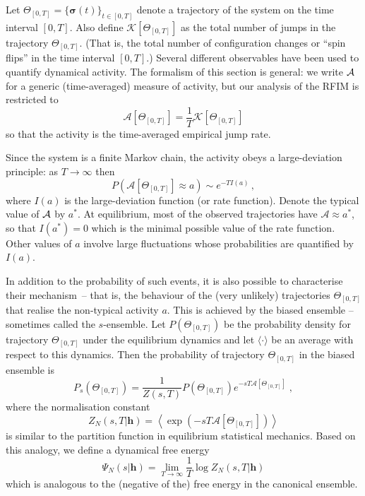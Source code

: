 \documentclass{iopart}
\begin{document}
Let $\Theta_{[0,T]} = \{ \bm{\sigma}(t) \}_{t \in [0,T]}$ denote a trajectory of the system on the time interval $[0,T]$.
Also define $\mathcal{K}[\Theta_{[0,T]}]$ as the total number of jumps in the trajectory $\Theta_{[0,T]}$.  (That is, the total number of configuration changes or ``spin flips'' in the time interval $[0,T]$.)
Several different observables have been used to quantify dynamical activity. 
The formalism of this section is general: we write ${\cal A}$ for a generic (time-averaged) measure of activity, but our analysis of the RFIM is restricted to
\begin{equation}
  \label{eq:7}
  \mathcal{A}[\Theta_{[0,T]}] = \frac{1}{T}\mathcal{K}[\Theta_{[0,T]}]
\end{equation}
so that the activity is the time-averaged empirical jump rate.

Since the system is a finite Markov chain, the activity obeys a large-deviation principle: as $T\to\infty$ then
\begin{equation}
  \label{eq:LDP_time-integrated_activity}
  P\left(\mathcal{A}[\Theta_{[0,T]}] \approx a\right) {\sim} e^{-T I(a)} \, ,
\end{equation}
where $I(a)$ is the large-deviation function (or rate function).  Denote the typical value of ${\cal A}$ by $a^\ast$.  
At equilibrium, most of the observed trajectories have $\mathcal{A}\approx a^{\ast}$, 
so that
$I(a^{\ast}) = 0$ which is the minimal possible value of the rate function. Other values of $a$ involve large fluctuations whose probabilities are quantified by $I(a)$. 

In addition to the probability of such events, it is also possible to characterise their mechanism~-- that is, the behaviour of the (very unlikely) trajectories $\Theta_{[0,T]}$ that realise the non-typical activity $a$.  
This is achieved by the biased ensemble 
 -- sometimes called the $s$-ensemble.  Let $P( \Theta_{[0,T]} )$ be the probability density for trajectory $\Theta_{[0,T]} $ under the equilibrium dynamics and let $\langle \cdot \rangle$ be an average with respect to this dynamics.  Then the  probability of trajectory $\Theta_{[0,T]} $ in the biased ensemble is 
\begin{equation}
  \label{eq:biased_ensemble}
  P_{s}( \Theta_{[0,T]} ) = \frac{1}{Z(s,T)} P( \Theta_{[0,T]} ) e^{-s T \mathcal{A}[ \Theta_{[0,T]} ]} \; ,
\end{equation}
where the normalisation constant
\begin{equation}\label{eq:partition_function_biased_ens}
  Z_N(s,T|\bm{h}) = \left\langle \exp(-s T \mathcal{A}[\Theta_{[0,T]}]) \right\rangle  
\end{equation}
is similar to the partition function in equilibrium statistical mechanics.  Based on this analogy, we define a dynamical free energy
\begin{equation}  
  \label{eq:def:Psi}
  \Psi_N(s|\bm{h}) = \lim_{T\to\infty} \frac{1}{T} \log Z_N(s,T|\bm{h})
\end{equation}
which is analogous to the (negative of the) free energy in the canonical ensemble.  
\end{document}
